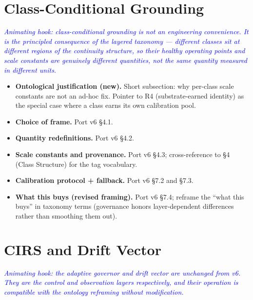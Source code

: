 \documentclass[11pt,twocolumn]{article}
\newcommand{\outlinenote}[1]{\textcolor{blue}{\textit{#1}}}
\begin{document}
\section{Class-Conditional Grounding}
\outlinenote{Animating hook: class-conditional grounding is not an
engineering convenience. It is the principled consequence of the
layered taxonomy — different classes sit at different regions of
the continuity structure, so their healthy operating points and
scale constants are genuinely different quantities, not the same
quantity measured in different units.}

\begin{itemize}
  \item \textbf{Ontological justification (new).} Short
        subsection: why per-class scale constants are not an
        ad-hoc fix. Pointer to R4 (substrate-earned identity) as
        the special case where a class earns its own calibration
        pool.
  \item \textbf{Choice of frame.} Port v6 §4.1.
  \item \textbf{Quantity redefinitions.} Port v6 §4.2.
  \item \textbf{Scale constants and provenance.} Port v6 §4.3;
        cross-reference to §4 (Class Structure) for the tag
        vocabulary.
  \item \textbf{Calibration protocol + fallback.} Port v6 §7.2
        and §7.3.
  \item \textbf{What this buys (revised framing).} Port v6 §7.4;
        reframe the ``what this buys'' in taxonomy terms
        (governance honors layer-dependent differences rather
        than smoothing them out).
\end{itemize}

\section{CIRS and Drift Vector}
\outlinenote{Animating hook: the adaptive governor and drift
vector are unchanged from v6. They are the control and observation
layers respectively, and their operation is compatible with the
ontology reframing without modification.}
\end{document}

